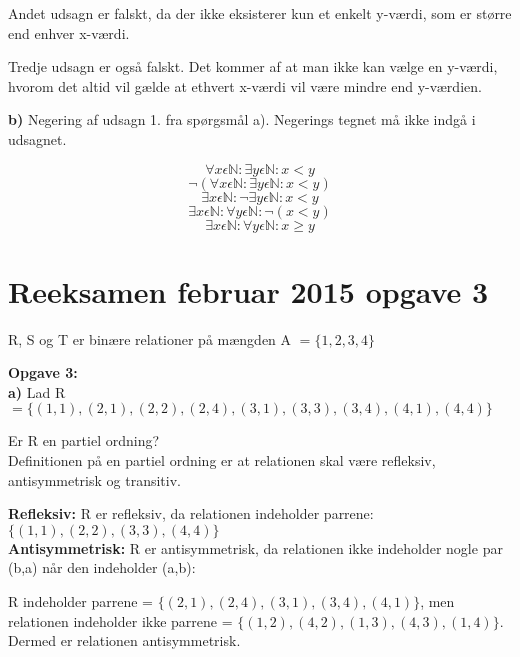 \documentclass{article}
\begin{document}
Andet udsagn er falskt, da der ikke eksisterer kun et enkelt y-værdi, som er større end enhver x-værdi. 

Tredje udsagn er også falskt. Det kommer af at man ikke kan vælge en y-værdi, hvorom det altid vil gælde at ethvert x-værdi vil være mindre end y-værdien.

\textbf{b)} Negering af udsagn 1. fra spørgsmål a). Negerings tegnet må ikke indgå i udsagnet. 

\begin{displaymath}
\forall x \epsilon \mathbb{N}: \exists y \epsilon \mathbb{N}: x<y
\end{displaymath}
\begin{displaymath}
\neg (\forall x \epsilon \mathbb{N}: \exists y \epsilon \mathbb{N}: x<y)
\end{displaymath}
\begin{displaymath}
\exists x \epsilon \mathbb{N}: \neg \exists y \epsilon \mathbb{N}: x<y
\end{displaymath}
\begin{displaymath}
\exists x \epsilon \mathbb{N}: \forall y \epsilon \mathbb{N}: \neg (x<y)
\end{displaymath}
\begin{displaymath}
\exists x \epsilon \mathbb{N}: \forall y \epsilon \mathbb{N}: x\geq y
\end{displaymath}

\section{Reeksamen februar 2015 opgave 3}
R, S og T er binære relationer på mængden A \(=\lbrace1, 2, 3, 4\rbrace\)

\textbf{Opgave 3:}\\
\textbf{a)} Lad R \(=\lbrace(1,1), (2,1), (2,2), (2,4), (3,1), (3,3), (3,4), (4,1), (4,4)\rbrace\)

Er R en partiel ordning?\\


Definitionen på en partiel ordning er at relationen skal være refleksiv, antisymmetrisk og transitiv. 

\textbf{Refleksiv:} R er refleksiv, da relationen indeholder parrene: \(\lbrace(1,1), (2,2), (3,3), (4,4)\rbrace\)\\

\textbf{Antisymmetrisk:} R er antisymmetrisk, da relationen ikke indeholder nogle par (b,a) når den indeholder (a,b): 

R indeholder parrene = \(\lbrace (2,1), (2,4), (3,1), (3,4), (4,1)\rbrace\), men relationen indeholder ikke parrene = \(\lbrace (1,2), (4,2), (1,3), (4,3), (1,4)\rbrace\). Dermed er relationen antisymmetrisk.  \\
\end{document}
